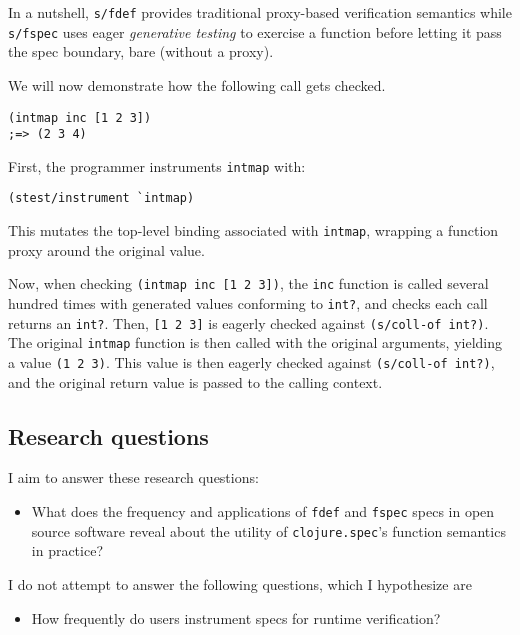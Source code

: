 In a nutshell, \texttt{s/fdef} provides traditional proxy-based
verification semantics while \texttt{s/fspec} uses eager \emph{generative testing}
to exercise a function before letting it pass the spec boundary, bare (without a proxy).

We will now demonstrate how the following call gets checked.

\begin{verbatim}
(intmap inc [1 2 3])
;=> (2 3 4)
\end{verbatim}

First, the programmer instruments \texttt{intmap} with:

\begin{verbatim}
(stest/instrument `intmap)
\end{verbatim}

This mutates the top-level binding associated with \texttt{intmap}, wrapping a function
proxy around the original value.

Now, when checking \texttt{(intmap inc [1 2 3])}, the \texttt{inc} function is
called several hundred times with generated values conforming to \texttt{int?},
and checks each call returns an \texttt{int?}.
Then, \texttt{[1 2 3]} is eagerly checked against \texttt{(s/coll-of int?)}.
The original \texttt{intmap} function is then called with the original arguments,
yielding a value \texttt{(1 2 3)}. This value is then eagerly checked against
\texttt{(s/coll-of int?)}, and the original return value is passed to the calling
context.

\subsection{Research questions}

I aim to answer these research questions:

\begin{itemize}
  \item What does the frequency and applications of \texttt{fdef} and \texttt{fspec} specs
    in open source software reveal about the utility of \texttt{clojure.spec}'s
    function semantics in practice?
\end{itemize}

I do not attempt to answer the following questions, which I hypothesize are

\begin{itemize}
  \item How frequently do users instrument specs for runtime verification?
\end{itemize}

